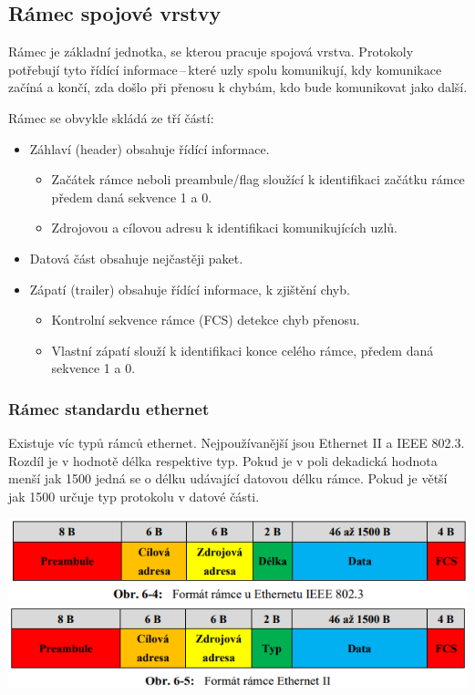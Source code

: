 \subsection{Rámec spojové vrstvy}

Rámec je základní jednotka, se kterou pracuje spojová vrstva. Protokoly potřebují tyto řídící informace\,--\,které uzly spolu komunikují, kdy komunikace začíná a končí, zda došlo při přenosu k chybám, kdo bude komunikovat jako další.

Rámec se obvykle skládá ze tří částí:
\begin{itemize}[noitemsep]
    \item Záhlaví (header) obsahuje řídící informace. 
    \begin{itemize}[noitemsep]
        \item Začátek rámce neboli preambule/flag sloužící k identifikaci začátku rámce předem daná sekvence 1 a 0.
        \item Zdrojovou a cílovou adresu k identifikaci komunikujících uzlů.
    \end{itemize}
    \item Datová část obsahuje nejčastěji paket.
    \item Zápatí (trailer) obsahuje řídící informace, k zjištění chyb.
    \begin{itemize}[noitemsep]
        \item Kontrolní sekvence rámce (FCS) detekce chyb přenosu.
        \item Vlastní zápatí slouží k identifikaci konce celého rámce, předem daná sekvence 1 a 0.
    \end{itemize}
\end{itemize}

\subsubsection{Rámec standardu ethernet}

Existuje víc typů rámců ethernet. Nejpoužívanější jsou Ethernet II a IEEE 802.3. Rozdíl je v hodnotě délka respektive typ. Pokud je v poli dekadická hodnota menší jak 1500 jedná se o délku udávající datovou délku rámce. Pokud je větší jak 1500 určuje typ protokolu v datové části. 

\begin{center}
    \includegraphics[scale= 0.53]{images/-023.png}
    \includegraphics[scale= 0.53]{images/-024.png}
\end{center}

